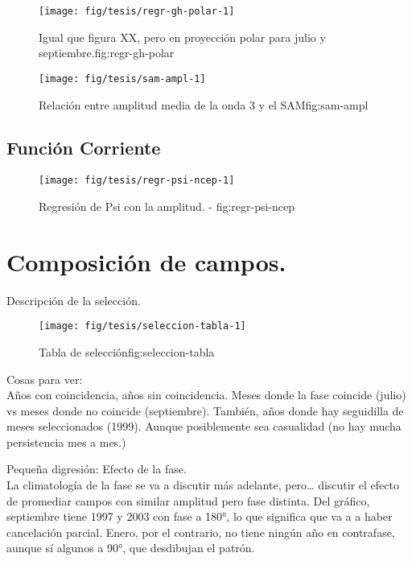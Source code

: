 \documentclass[spanish,a4paper]{book}
\begin{document}
\begin{figure}
\texttt{[image: fig/tesis/regr-gh-polar-1]} \caption{Igual que figura  XX, pero en proyección polar para julio y septiembre.{fig:regr-gh-polar}}\label{fig:regr-gh-polar}
\end{figure}

\begin{figure}
\texttt{[image: fig/tesis/sam-ampl-1]} \caption{Relación entre amplitud media de la onda 3 y el SAM{fig:sam-ampl}}\label{fig:sam-ampl}
\end{figure}

\subsection{Función Corriente}\label{funcion-corriente-1}

\begin{figure}

{\centering \texttt{[image: fig/tesis/regr-psi-ncep-1]} 

}

\caption{Regresión de Psi con la amplitud. - fig:regr-psi-ncep}\label{fig:regr-psi-ncep}
\end{figure}

\section{Composición de campos.}\label{composicion-de-campos.}

Descripción de la selección.

\begin{figure}

{\centering \texttt{[image: fig/tesis/seleccion-tabla-1]} 

}

\caption{Tabla de selección{fig:seleccion-tabla}}\label{fig:seleccion-tabla}
\end{figure}

Cosas para ver:\\
Años con coincidencia, años sin coincidencia. Meses donde la fase
coincide (julio) vs meses donde no coincide (septiembre). También, años
donde hay seguidilla de meses seleccionados (1999). Aunque posiblemente
sea casualidad (no hay mucha persistencia mes a mes.)

Pequeña digresión: Efecto de la fase.\\
La climatología de la fase se va a discutir más adelante, pero\ldots{}
discutir el efecto de promediar campos con similar amplitud pero fase
distinta. Del gráfico, septiembre tiene 1997 y 2003 con fase a 180°, lo
que significa que va a a haber cancelación parcial. Enero, por el
contrario, no tiene ningún año en contrafase, aunque sí algunos a 90°,
que desdibujan el patrón.
\end{document}

